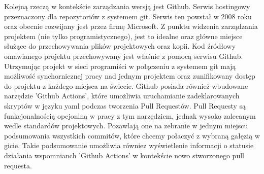 Kolejną rzeczą w kontekście zarządzania wersją jest Github. Serwis hostingowy przeznaczony dla repozytoriów z systemem git. Serwis ten powstał w 2008 roku oraz obecnie rozwijany jest przez firmę Microsoft. \cite{GithubWiki} Z punktu widzenia zarządzania projektem (nie tylko programistycznego), jest to idealne oraz główne miejsce służące do przechowywania plików projektowych oraz kopii. Kod źródłowy omawianego projektu przechowywany jest właśnie z pomocą serwisu Github. Utrzymując projekt w sieci programiści w połączeniu z systemem git mają możliwość synchornicznej pracy nad jednym projektem oraz zunifikowany dostęp do projektu z każdego miejsca na świecie. Github posiada również wbudowane narzędzie 'Github Actions', które umożliwia uruchamianie zadeklarowanych skryptów w języku yaml podczas tworzenia Pull Requestów. Pull Requesty są funkcjonalnością opcjonlną w pracy z tym narzędziem, jednak wysoko zalecanym wedle standardów projektowych. Pozawlają one na zebranie w jednym miejscu podsumowania wszystkich commitów, które chcemy połaczyć z wybraną gałęzią w gicie. Takie podsumowanie umożliwia równiez wyświetlenie informacji o statusie działania wspomnianch 'Github Actions' w kontekście nowo stworzonego pull requesta.